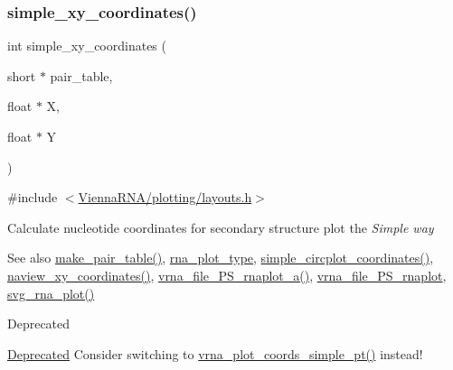 \subsubsection{\texorpdfstring{simple\_xy\_coordinates()}{simple\_xy\_coordinates()}}
{\footnotesize\ttfamily int simple\+\_\+xy\+\_\+coordinates (\begin{DoxyParamCaption}\item[{short $\ast$}]{pair\+\_\+table,  }\item[{float $\ast$}]{X,  }\item[{float $\ast$}]{Y }\end{DoxyParamCaption})}



{\ttfamily \#include $<$\mbox{\hyperlink{layouts_8h}{Vienna\+R\+N\+A/plotting/layouts.\+h}}$>$}



Calculate nucleotide coordinates for secondary structure plot the {\itshape Simple way} 

\begin{DoxySeeAlso}{See also}
\mbox{\hyperlink{group__struct__utils__deprecated_ga89c32307ee50a0026f4a3131fac0845a}{make\+\_\+pair\+\_\+table()}}, \mbox{\hyperlink{group__plotting__utils__deprecated_ga5964c4581431b098b80027d6e14dcdd4}{rna\+\_\+plot\+\_\+type}}, \mbox{\hyperlink{group__plotting__utils__deprecated_gac4ea13d35308f09940178d2b05a248c2}{simple\+\_\+circplot\+\_\+coordinates()}}, \mbox{\hyperlink{group__plotting__utils__deprecated_ga948111b910926f0405a3fa920c790816}{naview\+\_\+xy\+\_\+coordinates()}}, \mbox{\hyperlink{group__plotting__utils_ga139a31dd0ba9fc6612431f67de901c31}{vrna\+\_\+file\+\_\+\+P\+S\+\_\+rnaplot\+\_\+a()}}, \mbox{\hyperlink{group__plotting__utils_gabdc8f6548ba4a3bc3cd868ccbcfdb86a}{vrna\+\_\+file\+\_\+\+P\+S\+\_\+rnaplot}}, \mbox{\hyperlink{group__plotting__utils_gae7853539b5df98f294b4af434e979304}{svg\+\_\+rna\+\_\+plot()}}
\end{DoxySeeAlso}
\begin{DoxyRefDesc}{Deprecated}
\item[\mbox{\hyperlink{deprecated__deprecated000171}{Deprecated}}]Consider switching to \mbox{\hyperlink{group__plot__layout__utils_ga76788091848e73cfb24b31536e22b7dd}{vrna\+\_\+plot\+\_\+coords\+\_\+simple\+\_\+pt()}} instead!\end{DoxyRefDesc}



